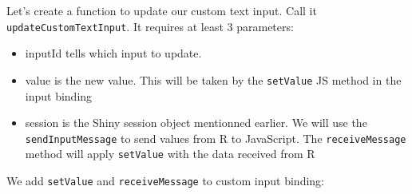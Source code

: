 \documentclass[
]{book}
\newenvironment{Shaded}{\begin{snugshade}}{\end{snugshade}}
\newcommand{\ControlFlowTok}[1]{\textcolor[rgb]{0.13,0.29,0.53}{\textbf{#1}}}
\newcommand{\DataTypeTok}[1]{\textcolor[rgb]{0.13,0.29,0.53}{#1}}
\newcommand{\KeywordTok}[1]{\textcolor[rgb]{0.13,0.29,0.53}{\textbf{#1}}}
\newcommand{\NormalTok}[1]{#1}
\newcommand{\OperatorTok}[1]{\textcolor[rgb]{0.81,0.36,0.00}{\textbf{#1}}}
\newcommand{\OtherTok}[1]{\textcolor[rgb]{0.56,0.35,0.01}{#1}}
\newcommand{\StringTok}[1]{\textcolor[rgb]{0.31,0.60,0.02}{#1}}
\providecommand{\tightlist}{%
  \setlength{\itemsep}{0pt}\setlength{\parskip}{0pt}}
\begin{document}
Let's create a function to update our custom text input. Call it \texttt{updateCustomTextInput}. It requires at least 3 parameters:

\begin{itemize}
\tightlist
\item
  inputId tells which input to update.
\item
  value is the new value. This will be taken by the \texttt{setValue} JS method in the input binding
\item
  session is the Shiny session object mentionned earlier. We will use the \texttt{sendInputMessage} to send values from R to JavaScript. The \texttt{receiveMessage} method will apply \texttt{setValue} with the data received from R
\end{itemize}

\begin{Shaded}
\end{Shaded}

We add \texttt{setValue} and \texttt{receiveMessage} to custom input binding:
\end{document}
